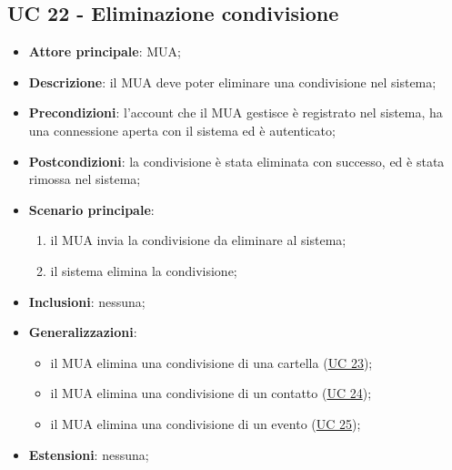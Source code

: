 \subsection{UC 22 - Eliminazione condivisione} \label{sec:UC22}
    \begin{itemize}
        \item \textbf{Attore principale}: MUA;
        \item \textbf{Descrizione}: il MUA deve poter eliminare una condivisione nel sistema;
        \item \textbf{Precondizioni}: l’account che il MUA gestisce è registrato nel sistema, ha una connessione aperta con il sistema ed è autenticato;
        \item \textbf{Postcondizioni}: la condivisione è stata eliminata con successo, ed è stata rimossa nel sistema;
        \item \textbf{Scenario principale}:
            \begin{enumerate}
                \item il MUA invia la condivisione da eliminare al sistema;
                \item il sistema elimina la condivisione;
            \end{enumerate}
        \item \textbf{Inclusioni}: nessuna;
        \item \textbf{Generalizzazioni}:
            \begin{itemize}
                \item il MUA elimina una condivisione di una cartella (\hyperref[sec:UC23]{UC 23});
                \item il MUA elimina una condivisione di un contatto (\hyperref[sec:UC24]{UC 24});
                \item il MUA elimina una condivisione di un evento (\hyperref[sec:UC25]{UC 25});
            \end{itemize}
        \item \textbf{Estensioni}: nessuna;
    \end{itemize}